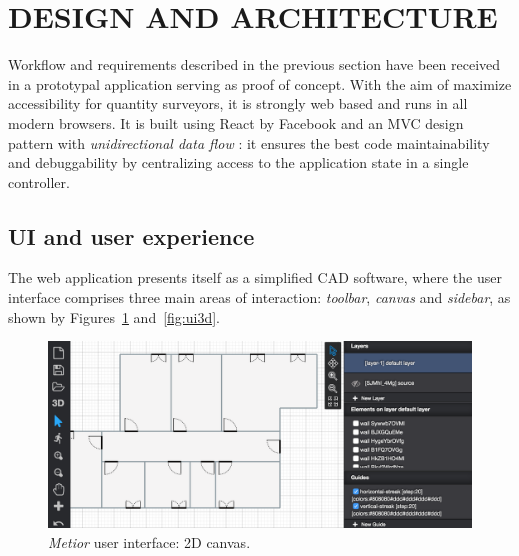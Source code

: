 \section{\uppercase{Design and Architecture}}
\label{sec:architecture}


\noindent
Workflow and requirements described in the previous section have been received in a prototypal application serving as proof of concept. With the aim of maximize accessibility for quantity surveyors, it is strongly web based and runs in all modern browsers. It is built using React by Facebook and an MVC design pattern with \emph{unidirectional data flow} \cite{redux}:  it ensures the best code maintainability and debuggability by centralizing access to the application state in a single controller.

\subsection{UI and user experience}

\noindent
The web application presents itself as a simplified CAD software, where the user interface comprises three main areas of interaction: \emph{toolbar}, \emph{canvas} and \emph{sidebar}, as shown by Figures~\ref{fig:ui2d} and~\ref{fig:ui3d}.

\begin{figure}[htbp] %
   \centering
   \includegraphics[width=1\linewidth]{images/2d}
   \caption{\emph{Metior} user interface: 2D canvas.}
   \label{fig:ui2d}
\end{figure}

